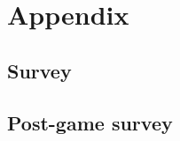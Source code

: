 \chapter{Appendix}\label{chap:appendix}
\section{Survey}\label{app:survey}

\section{Post-game survey}\label{app:postgamesurvey}
